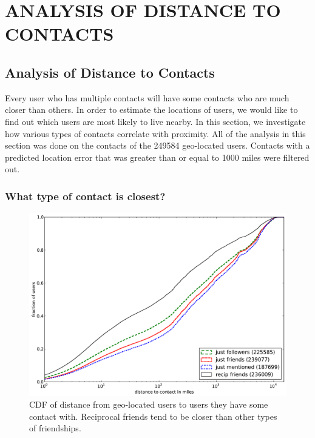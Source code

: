 \ifdefined\THESIS
    \chapter{\uppercase{Analysis of Distance to Contacts}}
\else
    \section{Analysis of Distance to Contacts}
    \label{sec:analysis}
\fi



Every user who has multiple contacts will have some contacts who are much
closer than others.
%
In order to estimate the locations of users, we would like
to find out which users are most likely to live nearby.
%
In this section, we investigate how various types of contacts correlate with
proximity.
%
All of the analysis in this section was done on the contacts of the 249584
geo-located users.
%
Contacts with a predicted location error that was greater than or equal to 1000
miles were filtered out.

\subsection{What type of contact is closest?}
\label{sec:EdgeTypes}

\begin{figure}[tb]
\centering
\includegraphics[width=\linewidth]{figures/edge_types_cuml.pdf}
\caption{
CDF of distance from geo-located users to users they have some contact
with.
%
Reciprocal friends tend to be closer than other types of friendships.
}
\label{fig:EdgeTypesCuml}
\end{figure}

